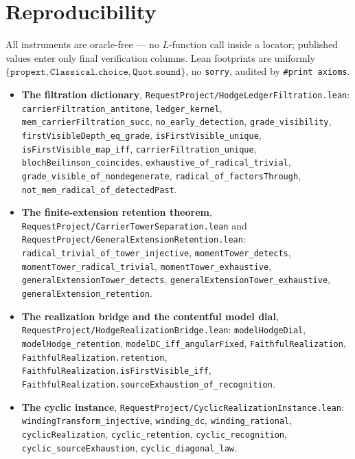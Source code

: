 \documentclass[11pt]{article}
\theoremstyle{definition}
\theoremstyle{remark}
\begin{document}
\appendix

\section{Reproducibility}\label{app:repro}

All instruments are oracle-free --- no $L$-function call inside a locator;
published values enter only final verification columns. Lean footprints are
uniformly $\{\texttt{propext},\texttt{Classical.choice},\texttt{Quot.sound}\}$,
no \texttt{sorry}, audited by \texttt{\#print axioms}.

\begin{itemize}
\item \textbf{The filtration dictionary},
\texttt{RequestProject/HodgeLedgerFiltration.lean}:
\texttt{carrierFiltration\_antitone}, \texttt{ledger\_kernel},
\texttt{mem\_carrierFiltration\_succ}, \texttt{no\_early\_detection},
\texttt{grade\_visibility}, \texttt{firstVisibleDepth\_eq\_grade},
\texttt{isFirstVisible\_unique}, \texttt{isFirstVisible\_map\_iff},
\texttt{carrierFiltration\_unique}, \texttt{blochBeilinson\_coincides},
\texttt{exhaustive\_of\_radical\_trivial},
\texttt{grade\_visible\_of\_nondegenerate},
\texttt{radical\_of\_factorsThrough},
\texttt{not\_mem\_radical\_of\_detectedPast}.
\item \textbf{The finite-extension retention theorem},
\texttt{RequestProject/CarrierTowerSeparation.lean} and
\texttt{RequestProject/GeneralExtensionRetention.lean}:
\texttt{radical\_trivial\_of\_tower\_injective},
\texttt{momentTower\_detects}, \texttt{momentTower\_radical\_trivial},
\texttt{momentTower\_exhaustive}, \texttt{generalExtensionTower\_detects},
\texttt{generalExtensionTower\_exhaustive},
\texttt{generalExtension\_retention}.
\item \textbf{The realization bridge and the contentful model dial},
\texttt{RequestProject/HodgeRealizationBridge.lean}:
\texttt{modelHodgeDial}, \texttt{modelHodge\_retention},
\texttt{modelDC\_iff\_angularFixed}, \texttt{FaithfulRealization},
\texttt{FaithfulRealization.retention},
\texttt{FaithfulRealization.isFirstVisible\_iff},
\texttt{FaithfulRealization.sourceExhaustion\_of\_recognition}.
\item \textbf{The cyclic instance},
\texttt{RequestProject/CyclicRealizationInstance.lean}:
\texttt{windingTransform\_injective}, \texttt{winding\_dc},
\texttt{winding\_rational}, \texttt{cyclicRealization},
\texttt{cyclic\_retention}, \texttt{cyclic\_recognition},
\texttt{cyclic\_sourceExhaustion}, \texttt{cyclic\_diagonal\_law}.

\end{itemize}
\end{document}
